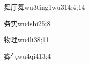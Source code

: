 \begin{verbete}{舞厅舞}{wu3ting1wu3}{14;4;14}
\end{verbete}

\begin{verbete}{务实}{wu4shi2}{5;8}
\end{verbete}

\begin{verbete}{物理}{wu4li3}{8;11}
\end{verbete}

\begin{verbete}{雾气}{wu4qi4}{13;4}
\end{verbete}


